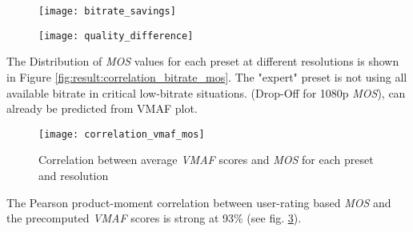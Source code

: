 \begin{figure}[htb!]
	\centering
	\texttt{[image: bitrate\_savings]}
	\caption{}
	\label{fig:result:bitrate_savings}
\end{figure}
\begin{figure}[htb!]
	\centering
	\texttt{[image: quality\_difference]}
	\caption{}
	\label{fig:result:quality_difference}
\end{figure}

The Distribution of \textit{MOS} values for each preset at different resolutions is shown in Figure \ref{fig:result:correlation_bitrate_mos}.
The "expert" preset is not using all available bitrate in critical low-bitrate situations. (Drop-Off for 1080p \textit{MOS}), can already be predicted from VMAF plot.





\begin{figure}[htb!]
	\centering
	\texttt{[image: correlation\_vmaf\_mos]}
	\caption{Correlation between average \textit{VMAF} scores and \textit{MOS} for each preset and resolution}
	\label{fig:result:correlation_vmaf_mos}
\end{figure}

The Pearson product-moment correlation between user-rating based \textit{MOS} and the precomputed \textit{VMAF} scores is strong at 93\% (see fig. \ref{fig:result:correlation_vmaf_mos}).
\\
